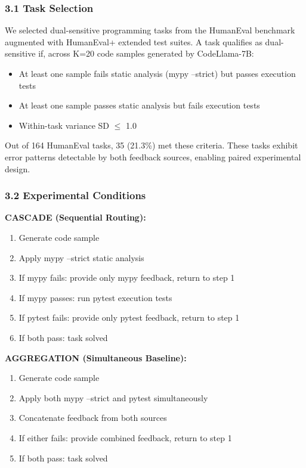 
\subsubsection{3.1 Task Selection}

We selected dual-sensitive programming tasks from the HumanEval benchmark augmented with HumanEval+ extended test suites. A task qualifies as dual-sensitive if, across K=20 code samples generated by CodeLlama-7B:

\begin{itemize}
\item At least one sample fails static analysis (mypy --strict) but passes execution tests
\item At least one sample passes static analysis but fails execution tests
\item Within-task variance SD $\leq$ 1.0
\end{itemize}

Out of 164 HumanEval tasks, 35 (21.3\%) met these criteria. These tasks exhibit error patterns detectable by both feedback sources, enabling paired experimental design.

\subsubsection{3.2 Experimental Conditions}

\textbf{CASCADE (Sequential Routing):}
\begin{enumerate}
\item Generate code sample
\item Apply mypy --strict static analysis
\item If mypy fails: provide only mypy feedback, return to step 1
\item If mypy passes: run pytest execution tests
\item If pytest fails: provide only pytest feedback, return to step 1
\item If both pass: task solved
\end{enumerate}

\textbf{AGGREGATION (Simultaneous Baseline):}
\begin{enumerate}
\item Generate code sample
\item Apply both mypy --strict and pytest simultaneously
\item Concatenate feedback from both sources
\item If either fails: provide combined feedback, return to step 1
\item If both pass: task solved
\end{enumerate}

